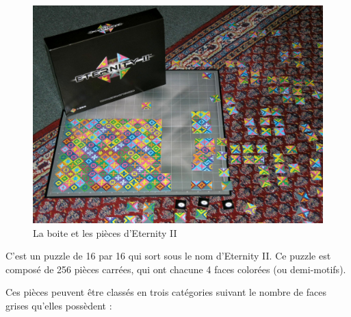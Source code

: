 	\begin{figure}[H]
		\includegraphics[width=\linewidth]{images/eternity_2.jpg}
		\caption{La boite et les pièces d'Eternity II}
		\label{fig:eternity_2}
	\end{figure}
	
	C'est un puzzle de 16 par 16 qui sort sous le nom d'Eternity II. Ce puzzle est composé de 256 pièces carrées, qui ont chacune 4 faces colorées (ou demi-motifs).
	
	Ces pièces peuvent être classés en trois catégories suivant le nombre de faces grises qu'elles possèdent :
	
